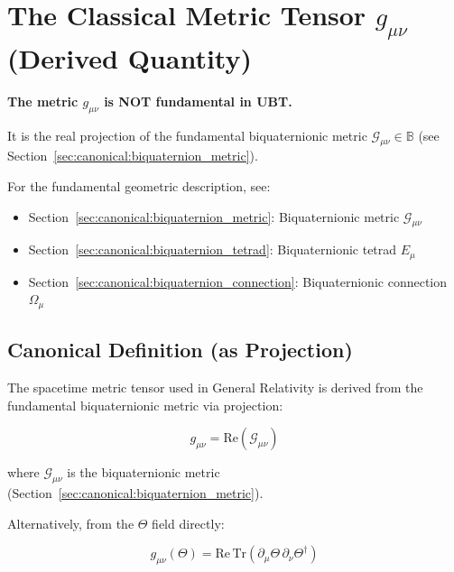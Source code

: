 
\section{The Classical Metric Tensor $g_{\mu\nu}$ (Derived Quantity)}
\label{sec:canonical:metric}

\begin{tcolorbox}[colback=yellow!10!white,colframe=orange!75!black,title=Important: This is a Derived Quantity]
\textbf{The metric $g_{\mu\nu}$ is NOT fundamental in UBT.}

It is the real projection of the fundamental biquaternionic metric $\mathcal{G}_{\mu\nu} \in \mathbb{B}$ (see Section~\ref{sec:canonical:biquaternion_metric}).

For the fundamental geometric description, see:
\begin{itemize}
    \item Section~\ref{sec:canonical:biquaternion_metric}: Biquaternionic metric $\mathcal{G}_{\mu\nu}$
    \item Section~\ref{sec:canonical:biquaternion_tetrad}: Biquaternionic tetrad $E_\mu$
    \item Section~\ref{sec:canonical:biquaternion_connection}: Biquaternionic connection $\Omega_\mu$
\end{itemize}
\end{tcolorbox}

\subsection{Canonical Definition (as Projection)}

The spacetime metric tensor used in General Relativity is derived from the fundamental biquaternionic metric via projection:

\begin{equation}
\label{eq:canonical:metric_projection}
\boxed{g_{\mu\nu} = \text{Re}(\mathcal{G}_{\mu\nu})}
\end{equation}

\noindent where $\mathcal{G}_{\mu\nu}$ is the biquaternionic metric (Section~\ref{sec:canonical:biquaternion_metric}).

Alternatively, from the $\Theta$ field directly:

\begin{equation}
\label{eq:canonical:metric_from_theta}
g_{\mu\nu}(\Theta) = \text{Re}\,\text{Tr}\left(\partial_\mu\Theta \, \partial_\nu\Theta^\dagger\right)
\end{equation}

